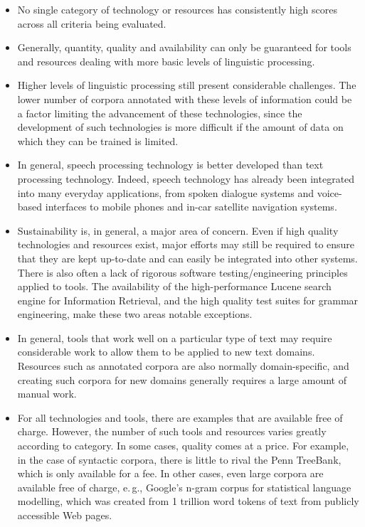 \documentclass[]{../../metanetpaper}
\begin{document}
\begin{multicols}{2}
\begin{itemize}
\item No single category of technology or resources has consistently high scores across all criteria being evaluated.         
\item Generally, quantity, quality and availability can only be guaranteed for tools and resources dealing with more basic levels of linguistic processing.    
\item Higher levels of linguistic processing still present considerable challenges. The lower number of corpora annotated with these levels of information could be a factor limiting the advancement of these technologies, since the development of such technologies is more difficult if the amount of data on which they can be trained is limited.
\item In general, speech processing technology is better developed than text processing technology. Indeed, speech technology has already been integrated into many everyday applications, from spoken dialogue systems and voice-based interfaces to mobile phones and in-car satellite navigation systems.
\item Sustainability is, in general, a major area of concern. Even if high quality technologies and resources exist, major efforts may still be required to ensure that they are kept up-to-date and can easily be integrated into other systems. There is also often a lack of rigorous software testing/engineering principles applied to tools. The availability of the high-performance Lucene search engine for Information Retrieval, and the high quality test suites for grammar engineering, make these two areas notable exceptions.  
\item In general, tools that work well on a particular type of text may require considerable work to allow them to be applied to new text domains. Resources such as annotated corpora are also normally domain-specific, and creating such corpora for new domains generally requires a large amount of manual work.      
\item For all technologies and tools, there are examples that are available free of charge. However, the number of such tools and resources varies greatly according to category.  In some cases, quality comes at a price. For example, in the case of syntactic corpora, there is little to rival the Penn TreeBank, which is only available for a fee. In other cases, even large corpora are available free of charge, e.\,g., Google's n-gram corpus for statistical language modelling, which was created from 1 trillion word tokens of text from publicly accessible Web pages.       

\end{itemize}
\end{multicols}
\end{document}
